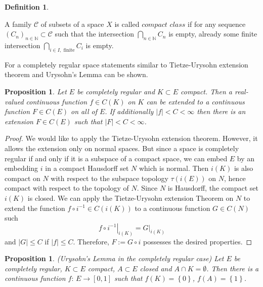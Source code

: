 \documentclass[a4paper,12pt]{article}
\newtheorem{proposition}[theorem]{Proposition}
\theoremstyle{definition}
\newtheorem{definition}[theorem]{Definition}
\theoremstyle{remark}
\numberwithin{equation}{section}
\numberwithin{theorem}{section}
\begin{document}
\begin{definition}
\label{def:compact class}

A family $\mathcal{C}$ of subsets of a space $X$ is called $compact$
$class$ if for any sequence $\left(C_{n}\right)_{n\in\mathbb{N}}\subset\mathcal{C}$
such that the intersection $\underset{n\in\mathbb{N}}{\bigcap}C_{n}$
is empty, already some finite intersection $\underset{i\in I,\text{ finite}}{\bigcap}C_{i}$
is empty.
\end{definition}

For a completely regular space statements similar to Tietze-Urysohn
extension theorem and Urysohn's Lemma can be shown.
\begin{proposition}
\label{prop: Tietze extension completely regular case} Let $E$ be
completely regular and $K\subset E$ compact. Then a real-valued continuous
function $f\in C\left(K \right)$ on $K$ can be extended
to a continuous function $F\in C\left(E \right)$ on all
of $E$. If additionally $\left|f\right|<C<\infty$ then there is
an extension $F\in C\left(E \right)$ such that $\left|F\right|<C<\infty$.
\end{proposition}

\begin{proof}
We would like to apply the Tietze-Urysohn extension theorem. However, it allows the
extension only on normal spaces. But since a space is completely regular if and only if it is a  subspace of a compact space, 
we can embed $E$ by an embedding $i$ in a compact Hausdorff
set $N$ which is normal. Then $i(K)$ is also compact on $N$ with respect to the subspace
topology $\tau(i(E))$ on
$N$, hence compact with respect to the topology of $N$. Since $N$ is Hausdorff,
the compact set $i(K)$ is closed.
We can apply the Tietze-Urysohn extension Theorem
on $N$ to extend the function $f\circ i^{-1}\in C(i(K))$
to a continuous function $G\in C(N)$ such 
\[
\left.f\circ i^{-1}\right|_{i(K)}=\left.G\right|_{i(K)}
\]
and $\left|G\right|\leq C$ if $\left|f\right|\leq C$. Therefore,
$F:=G\circ i$ possesses the desired properties. 
\end{proof}   
   
\begin{proposition}
\label{prop: Urysohn's Lemma completely regular case} (Urysohn's
Lemma in the completely regular case) Let $E$ be completely regular,
$K\subset E$ compact, $A\subset E$ closed and $A\cap K=\emptyset$.
Then there is a continuous function $f:\,E\rightarrow\left[0,1\right]$
such that $f(K)=\left\{ 0\right\} $, $f(A)=\left\{ 1\right\} $.
\end{proposition}
\end{document}
